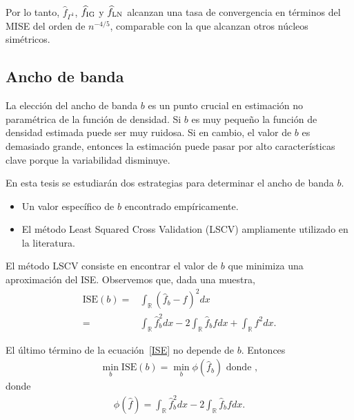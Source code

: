 Por lo tanto, $\widehat{f}_{\Gamma^1}$, $\widehat{f}_{\tiny{\text{IG}}}$ y $\widehat{f}_{\tiny{\text{LN}}}$ alcanzan una tasa de convergencia en términos del MISE del orden de $n^{-4/5}$, comparable con la que alcanzan otros núcleos simétricos.


\subsection{Ancho de banda}
\label{AnchoBanda}

La elección del ancho de banda $b$ es un punto crucial en estimación no paramétrica de la función de densidad. Si $b$ es muy pequeño la función de densidad estimada puede ser muy ruidosa. Si en cambio, el valor de $b$ es demasiado grande, entonces la estimación puede pasar por alto características clave porque la variabilidad disminuye.

En esta tesis se estudiarán dos estrategias para determinar el ancho de banda $b$.

\begin{itemize}
	\item Un valor específico de $b$ encontrado empíricamente.
	\item El método Least Squared Cross Validation (LSCV) ampliamente utilizado en la literatura.
\end{itemize}


El método LSCV consiste en encontrar el valor de $b$ que minimiza una aproximación del ISE. Observemos que, dada una muestra,
\begin{align}
\label{ISE}
\text{ISE}(b)=&\int_\mathbb{R} (\widehat{f}_b-f)^2 dx \nonumber\\ 
=& \int_\mathbb{R} \widehat{f}_b^2dx- 2 \int_\mathbb{R} \widehat{f}_b fdx +\int_\mathbb{R} f^2dx.
\end{align}

El último término de la ecuación~\eqref{ISE} no depende de $b$. Entonces
\begin{align}
\nonumber \min_b \text{ISE}(b)= \min_b \phi(\widehat{f}_b) \text{ donde } ,
\end{align}
donde
\begin{align}
\label{fi}
\phi(\widehat{f})=\int_\mathbb{R} \widehat{f}_b^2 dx- 2 \int_\mathbb{R} \widehat{f}_b fdx.
\end{align}

